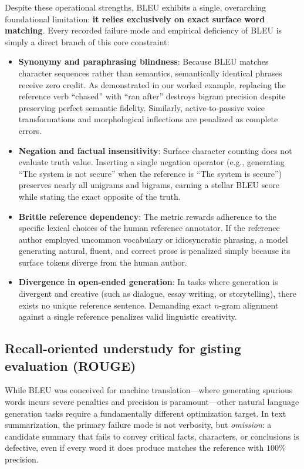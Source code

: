 \documentclass[../../../main.tex]{subfiles}
\begin{document}
Despite these operational strengths, BLEU exhibits a single, overarching foundational limitation: \textbf{it relies exclusively on exact surface word matching}. Every recorded failure mode and empirical deficiency of BLEU is simply a direct branch of this core constraint:
\begin{itemize}
    \item \textbf{Synonymy and paraphrasing blindness}: Because BLEU matches character sequences rather than semantics, semantically identical phrases receive zero credit. As demonstrated in our worked example, replacing the reference verb ``chased'' with ``ran after'' destroys bigram precision despite preserving perfect semantic fidelity. Similarly, active-to-passive voice transformations and morphological inflections are penalized as complete errors.
    \item \textbf{Negation and factual insensitivity}: Surface character counting does not evaluate truth value. Inserting a single negation operator (e.g., generating ``The system is not secure'' when the reference is ``The system is secure'') preserves nearly all unigrams and bigrams, earning a stellar BLEU score while stating the exact opposite of the truth.
    \item \textbf{Brittle reference dependency}: The metric rewards adherence to the specific lexical choices of the human reference annotator. If the reference author employed uncommon vocabulary or idiosyncratic phrasing, a model generating natural, fluent, and correct prose is penalized simply because its surface tokens diverge from the human author.
    \item \textbf{Divergence in open-ended generation}: In tasks where generation is divergent and creative (such as dialogue, essay writing, or storytelling), there exists no unique reference sentence. Demanding exact $n$-gram alignment against a single reference penalizes valid linguistic creativity.
\end{itemize}


\subsection{Recall-oriented understudy for gisting evaluation (ROUGE)}
\label{subsec:rouge}

While BLEU was conceived for machine translation---where generating spurious words incurs severe penalties and precision is paramount---other natural language generation tasks require a fundamentally different optimization target. In text summarization, the primary failure mode is not verbosity, but \textit{omission}: a candidate summary that fails to convey critical facts, characters, or conclusions is defective, even if every word it does produce matches the reference with $100\%$ precision.
\end{document}
